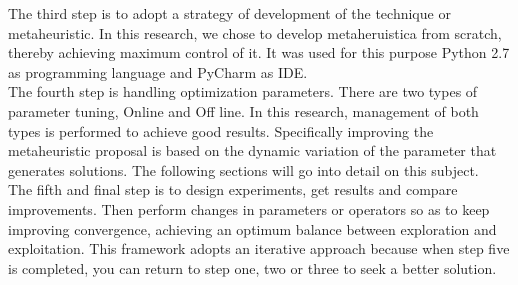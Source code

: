 The third step is to adopt a strategy of development of the technique or metaheuristic. In this research, we chose to develop metaheruistica from scratch, thereby achieving maximum control of it. It was used for this purpose Python 2.7 as programming language and  PyCharm as IDE.\\

The fourth step is handling optimization parameters. There are two types of parameter tuning, Online and Off line. In this research, management of both types is performed to achieve good results. Specifically improving the metaheuristic proposal is based on the dynamic variation of the parameter that generates solutions. The following sections will go into detail on this subject.\\

The fifth and final step is to design experiments, get results and compare improvements. Then perform changes in parameters or operators so as to keep improving convergence, achieving an optimum balance between exploration and exploitation. This framework adopts an iterative approach because when step five is completed, you can return to step one, two or three to seek a better solution.